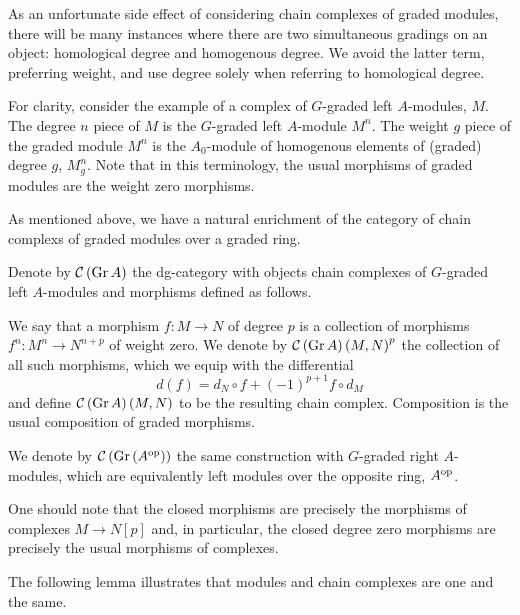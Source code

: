 As an unfortunate side effect of considering chain complexes of graded modules, there will be many instances where there are two simultaneous gradings on an object: homological degree and homogenous degree. 
We avoid the latter term, preferring weight, and use degree solely when referring to homological degree.

For clarity, consider the example of a complex of \(G\)-graded left \(A\)-modules, \(M\).
The degree \(n\) piece of \(M\) is the \(G\)-graded left \(A\)-module \(M^n\).
The weight \(g\) piece of the graded module \(M^n\) is the \(A_0\)-module of homogenous elements of (graded) degree \(g\), \(M^n_g\).
Note that in this terminology, the usual morphisms of graded modules are the weight zero morphisms.

As mentioned above, we have a natural enrichment of the category of chain complexs of graded modules over a graded ring.

\begin{definition}
  Denote by \(\mathcal{C}\left(\operatorname{Gr}A\right)\) the dg-category with objects chain complexes of \(G\)-graded left \(A\)-modules and morphisms defined as follows.
  
  We say that a morphism \(f \colon M \to N\) of degree \(p\) is a collection of morphisms \(f^n \colon M^n \to N^{n+p}\) of weight zero.
  We denote by \(\mathcal{C}\left(\operatorname{Gr}A\right)\left(M,N\right)^p\) the collection of all such morphisms, which we equip with the differential
  \[d(f) = d_N \circ f + (-1)^{p+1}f \circ d_M\]
  and define \(\mathcal{C}\left(\operatorname{Gr}A\right)(M,N)\) to be the resulting chain complex.
  Composition is the usual composition of graded morphisms.

  We denote by \(\mathcal{C}\left(\operatorname{Gr}\left(A^{{\operatorname{op}}}\right)\right)\) the same construction with \(G\)-graded right \(A\)-modules, which are equivalently left modules over the opposite ring, \(A^{\operatorname{op}}\).
\end{definition}

\begin{remark}
  One should note that the closed morphisms are precisely the morphisms of complexes \(M \to N[p]\) and, in particular, the closed degree zero morphisms are precisely the usual morphisms of complexes.
\end{remark}

The following lemma illustrates that modules and chain complexes are one and the same.

